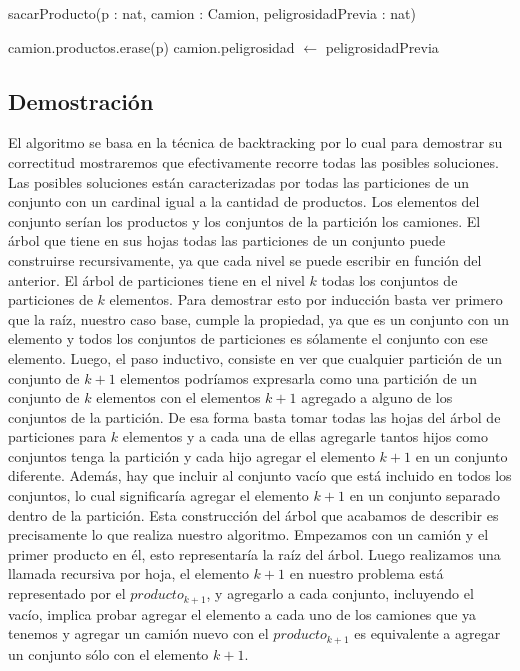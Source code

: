 \begin{algorithm}[H]
\begin{algorithmic}[1]
\caption{sacarProducto(p : nat, camion : Camion, peligrosidadPrevia : nat)}
\STATE camion.productos.erase(p)
\STATE camion.peligrosidad $\leftarrow$ peligrosidadPrevia
\end{algorithmic}
\end{algorithm}


\subsection{Demostraci\'on}
El algoritmo se basa en la técnica de backtracking por lo cual para demostrar su correctitud mostraremos que efectivamente recorre todas las posibles soluciones.
Las posibles soluciones están caracterizadas por todas las particiones de un conjunto con un cardinal igual a la cantidad de productos. Los elementos del conjunto
serían los productos y los conjuntos de la partición los camiones. El árbol que tiene en sus hojas todas las particiones de un conjunto puede construirse
recursivamente, ya que cada nivel se puede escribir en función del anterior. El árbol de particiones tiene en el nivel $k$ todas los conjuntos
de particiones de $k$ elementos. Para demostrar esto por inducción basta ver primero que la raíz, nuestro caso base, cumple la propiedad, ya que es 
un conjunto con un elemento y todos los conjuntos de particiones es sólamente el conjunto con ese elemento. Luego, el paso inductivo, consiste
en ver que cualquier partición de un conjunto de $k+1$ elementos podríamos expresarla como una partición de un conjunto de $k$ elementos con el 
elementos $k+1$ agregado a alguno de los conjuntos de la partición. De esa forma basta tomar todas las hojas del árbol de particiones para $k$ elementos
y a cada una de ellas agregarle tantos hijos como conjuntos tenga la partición y cada hijo agregar el elemento $k+1$ en un conjunto diferente. Además,
hay que incluir al conjunto vacío que está incluido en todos los conjuntos, lo cual significaría agregar el elemento $k+1$ en un conjunto separado
dentro de la partición. Esta construcción del árbol que acabamos de describir es precisamente lo que realiza nuestro algoritmo. Empezamos con un camión
y el primer producto en él, esto representaría la raíz del árbol. Luego realizamos una llamada recursiva por hoja, el elemento $k+1$ en nuestro problema
está representado por el $producto_{k+1}$, y agregarlo a cada conjunto, incluyendo el vacío, implica probar agregar el elemento a cada uno de los camiones
que ya tenemos y agregar un camión nuevo con el $producto_{k+1}$ es equivalente a agregar un conjunto sólo con el elemento $k+1$.

